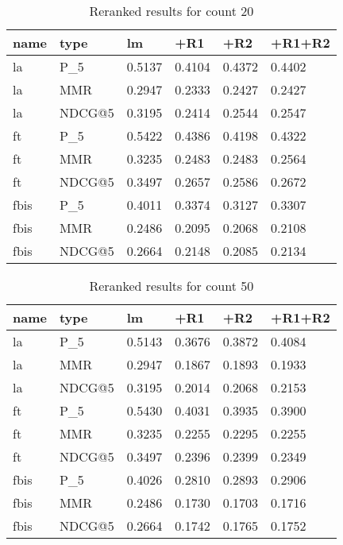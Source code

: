 \documentclass{sig-alternate}
\begin{document}
\begin{table}[h!]
\centering
\begin{tabular}{|l|l|l|l|l|l|}
\hline
name & type  & lm & +R1 & +R2 & +R1+R2 \\ \hline \hline
la & P\_5 & 0.5137 & 0.4104 & 0.4372 & 0.4402 \\ \hline 
la & MMR & 0.2947 & 0.2333 & 0.2427 & 0.2427 \\ \hline
la & NDCG@5 & 0.3195 & 0.2414 & 0.2544 & 0.2547 \\ \hline \hline
ft & P\_5 & 0.5422 & 0.4386 & 0.4198 & 0.4322 \\ \hline 
ft & MMR & 0.3235 & 0.2483 & 0.2483 & 0.2564 \\ \hline
ft & NDCG@5 & 0.3497 & 0.2657 & 0.2586 & 0.2672 \\ \hline \hline
fbis & P\_5 & 0.4011 & 0.3374 & 0.3127 & 0.3307 \\ \hline 
fbis & MMR & 0.2486 & 0.2095 & 0.2068 & 0.2108 \\ \hline
fbis & NDCG@5 & 0.2664 & 0.2148 & 0.2085 & 0.2134 \\ \hline
\end{tabular}
\caption{Reranked results for count 20}
\end{table}

\begin{table}[h!]
\centering
\begin{tabular}{|l|l|l|l|l|l|}
\hline
name & type  & lm & +R1 & +R2 & +R1+R2 \\ \hline \hline
la & P\_5 & 0.5143 & 0.3676 & 0.3872 & 0.4084 \\ \hline 
la & MMR & 0.2947 & 0.1867 & 0.1893 & 0.1933 \\ \hline
la & NDCG@5 & 0.3195 & 0.2014 & 0.2068 & 0.2153 \\ \hline \hline
ft & P\_5 & 0.5430 & 0.4031 & 0.3935 & 0.3900 \\ \hline 
ft & MMR & 0.3235 & 0.2255 & 0.2295 & 0.2255 \\ \hline
ft & NDCG@5 & 0.3497 & 0.2396 & 0.2399 & 0.2349 \\ \hline \hline
fbis & P\_5 & 0.4026 & 0.2810 & 0.2893 & 0.2906 \\ \hline 
fbis & MMR & 0.2486 & 0.1730 & 0.1703 & 0.1716 \\ \hline
fbis & NDCG@5 & 0.2664 & 0.1742 & 0.1765 & 0.1752 \\ \hline
\end{tabular}
\caption{Reranked results for count 50}
\end{table}
\end{document}
